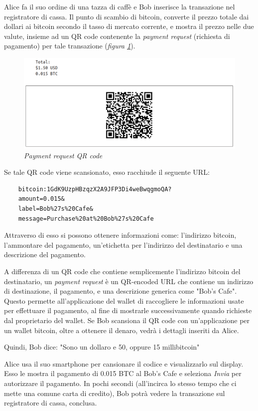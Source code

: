 Alice fa il suo ordine di una tazza di caffè e Bob inserisce la transazione nel registratore di cassa. Il punto di scambio di bitcoin, converte il prezzo totale dai dollari ai bitcoin secondo il tasso di mercato corrente, e mostra il prezzo nelle due valute, insieme ad un QR code contenente la \textit{payment request} (richiesta di pagamento) per tale transazione (\textit{figura \ref{fig:qrcode}}).
\begin{figure}[h]
	\centering
	\includegraphics[width= 0.8 \linewidth]{figure/qrcode}
	\caption{\textit{Payment request QR code} \label{fig:qrcode}}
\end{figure}

Se tale QR code viene scansionato, esso racchiude il seguente URL:
\begin{lstlisting}
	bitcoin:1GdK9UzpHBzqzX2A9JFP3Di4weBwqgmoQA?
	amount=0.015&
	label=Bob%27s%20Cafe&
	message=Purchase%20at%20Bob%27s%20Cafe
\end{lstlisting}

Attraverso di esso si possono ottenere informazioni come: l'indirizzo bitcoin, l'ammontare del pagamento, un'etichetta per l'indirizzo del destinatario e una descrizione del pagamento.

A differenza di un QR code che contiene semplicemente l'indirizzo bitcoin del destinatario, un \textit{payment request} è un QR-encoded URL che contiene un indirizzo di destinazione, il pagamento, e una descrizione generica come "Bob's Cafe". Questo permette all'applicazione del wallet di raccogliere le  informazioni usate per effettuare il pagamento, al fine di mostrarle successivamente quando richieste dal proprietario del wallet. Se Bob scansiona il QR code con un'applicazione per un wallet bitcoin, oltre a ottenere il denaro, vedrà i dettagli inseriti da Alice.

Quindi, Bob dice: "Sono un dollaro e 50, oppure 15 millibitcoin"

Alice usa il suo smartphone per cansionare il codice e visualizzarlo sul display. Esso le mostra il pagamento di 0.015 BTC al Bob's Cafe e seleziona \textit{Invia} per autorizzare il pagamento. In pochi secondi (all'incirca lo stesso tempo che ci mette una comune carta di credito), Bob potrà vedere la transazione sul registratore di cassa, conclusa.

